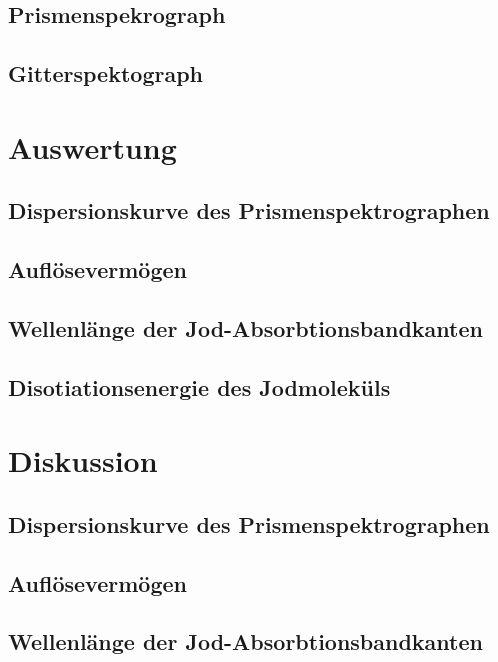\documentclass[12pt,english,ngerman]{scrartcl}
\begin{document}
\subsection{Prismenspekrograph}

\subsection{Gitterspektograph}


\section{Auswertung}\label{sec:auswertung}


\subsection{Dispersionskurve des Prismenspektrographen}


\subsection{Auflösevermögen}


\subsection{Wellenlänge der Jod-Absorbtionsbandkanten}


\subsection{Disotiationsenergie des Jodmoleküls}


\section{Diskussion}\label{sec:disk}


\subsection{Dispersionskurve des Prismenspektrographen}


\subsection{Auflösevermögen}


\subsection{Wellenlänge der Jod-Absorbtionsbandkanten}
\end{document}
